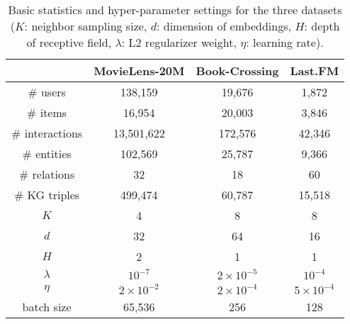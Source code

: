 \documentclass[sigconf]{acmart}
\begin{document}
		\begin{table}[t]
			\centering
			\setlength{\tabcolsep}{5pt}
			\caption{Basic statistics and hyper-parameter settings for the three datasets ($K$: neighbor sampling size, $d$: dimension of embeddings, $H$: depth of receptive field, $\lambda$: L2 regularizer weight, $\eta$: learning rate).}
			\begin{tabular}{c|ccc}
				\hline
				& MovieLens-20M & Book-Crossing & Last.FM\\
				\hline
				\# users & 138,159 & 19,676 & 1,872\\
				\# items & 16,954 & 20,003 & 3,846\\
				\# interactions & 13,501,622 & 172,576 & 42,346\\
				\# entities & 102,569 & 25,787 & 9,366\\
				\# relations & 32 & 18 & 60\\
				\# KG triples & 499,474 & 60,787 & 15,518\\
				\hline
				$K$ & 4 & 8 & 8\\
				$d$ & 32 & 64 & 16\\
				$H$ & 2 & 1 & 1\\
				$\lambda$ & $10^{-7}$ & $2 \times 10^{-5}$ & $10^{-4}$\\
				$\eta$ & $2 \times 10^{-2}$ & $2 \times 10^{-4}$ & $5 \times 10^{-4}$\\
				batch size & 65,536 & 256 & 128\\
				\hline
			\end{tabular}
			\label{table:statistics}
		\end{table}
		
\end{document}
